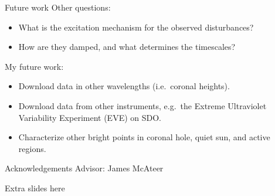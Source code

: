 \documentclass[table]{beamer}
\begin{document}
\begin{frame}{Future work}
    Other questions:
    \begin{itemize}
        \item What is the excitation mechanism for the observed
            disturbances?
        \item How are they damped, and what determines the timescales?
    \end{itemize}
    My future work:
    \begin{itemize}
        \item Download data in other wavelengths (i.e.\ coronal heights).
        \item Download data from other instruments,
            e.g.\ the Extreme Ultraviolet Variability Experiment
            (EVE) on SDO\@.
        \item Characterize other bright points in coronal hole,
            quiet sun, and active regions.
    \end{itemize}
\end{frame}%
\begin{frame}{Acknowledgements}
    Advisor: James McAteer
\end{frame}%

\begin{frame}{Extra slides here}
\end{frame}
\end{document}
